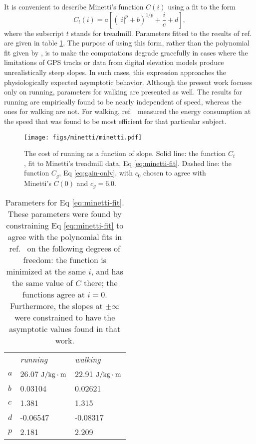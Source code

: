 \documentclass[10pt,letterpaper]{article}
\begin{document}
It is convenient to describe Minetti's function $C(i)$ using a fit to the form
\begin{equation}\label{eq:minetti-fit}
  C_t(i) = a\left[(|i|^p+b)^{1/p}+\frac{i}{c}+d\right],
\end{equation}
where the subscript $t$ stands for treadmill.
Parameters fitted to the results of ref.~\cite{minetti} are given in table \ref{table:minetti-params}.
The purpose of using this form, rather than the polynomial fit given by \cite{minetti}, is
to make the computations degrade gracefully in cases where the limitations of GPS tracks or data from digital elevation models
produce unrealistically steep slopes. In such cases, this expression approaches the physiologically
expected asymptotic behavior. Although the present work focuses only on running, parameters for walking
are presented as well. The results for running are empirically found to be nearly independent of speed,
whereas the ones for walking are not. For walking, ref.~\cite{minetti} measured the energy consumption
at the speed that was found to be most efficient for that
particular subject.

\begin{figure}[h]
\texttt{[image: figs/minetti/minetti.pdf]}
\centering
\caption{The cost of running as a function of slope. Solid line: the function $C_t$, fit to Minetti's treadmill data, Eq \ref{eq:minetti-fit}. Dashed line:
the function $C_g$, Eq \ref{eq:gain-only}, with $c_0$ chosen to agree with Minetti's $C(0)$ and $c_g=6.0$.}
\label{fig:minetti}
\end{figure}

\begin{table}[h]
\caption{Parameters for Eq \eqref{eq:minetti-fit}. These parameters were found by constraining
Eq \ref{eq:minetti-fit} to agree with the polynomial fits in ref.~\cite{minetti} on the following
degrees of freedom: the function is minimized at the same $i$, and has the same value of $C$ there;
the functions agree at $i=0$. Furthermore, the slopes at $\pm\infty$ were constrained to have the asymptotic values
found in that work.}
\begin{tabular}{lll}
   & \emph{running} & \emph{walking} \\
$a$  & 26.07 $\textup{J}/\textup{kg}\cdot\textup{m}$ & 22.91 $\textup{J}/\textup{kg}\cdot\textup{m}$ \\
$b$  & 0.03104 & 0.02621 \\
$c$ & 1.381 & 1.315 \\
$d$ & -0.06547 & -0.08317 \\
$p$ & 2.181 & 2.209
\end{tabular}
\label{table:minetti-params}
\end{table}
\end{document}
